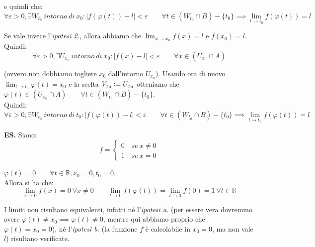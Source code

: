 \documentclass{article}
\begin{document}
\noindent e quindi che:
\begin{equation*}
    \forall \varepsilon > 0, \exists W_{t_0} \ intorno \ di \ x_0 : |f(\varphi(t)) - l| < \varepsilon \qquad \forall t \in (W_{t_0} \cap B) - \{t_0\} \implies \lim_{t \to t_0} f(\varphi(t)) = l
\end{equation*}

\noindent Se vale invece l'\textit{ipotesi 2.}, allora abbiamo che $\lim_{x \to x_0} f(x) = l$ e $f(x_0) = l$. Quindi:
\begin{equation*}
    \forall \varepsilon > 0, \exists U_{x_0} \ intorno \ di \ x_0 : |f(x) - l| < \varepsilon \qquad \forall x \in (U_{x_0} \cap A)
\end{equation*}

\noindent (ovvero non dobbiamo togliere $x_0$ dall'intorno $U_{x_0}$). Usando ora di nuovo $\lim_{t \to t_0} \varphi(t) = x_0$ e la scelta $V_{x_0} \vcentcolon = U_{x_0}$ otteniamo che $\varphi(t) \in (U_{x_0} \cap A) \qquad \forall t \in (W_{t_0} \cap B) - \{t_0\}$.\\
Quindi:
\begin{equation*}
    \forall \varepsilon > 0, \exists W_{t_0} \ intorno \ di \ t_0 : |f(\varphi(t)) - l| < \varepsilon \qquad \forall t \in (W_{t_0} \cap B) - \{t_0\} \implies \lim_{t \to t_0} f(\varphi(t)) = l
\end{equation*}


\noindent\textbf{ES.} Siano:
\begin{equation*}
    f =
    \begin{cases}
       0 \quad se \ x \neq 0\\
       1 \quad se \ x = 0
    \end{cases}
\end{equation*}

\noindent $\varphi(t) = 0 \qquad \forall t \in \mathbb{R}, x_0 = 0, t_0 = 0$.\\
Allora si ha che:
\begin{equation*}
    \lim_{x \to 0} f(x) = 0 \ \forall x \neq 0 \qquad \lim_{t \to 0} f(\varphi(t)) = \lim_{t \to 0} f(0) = 1 \ \forall t \in \mathbb{R}
\end{equation*}

\noindent I limiti non risultano equivalenti, infatti né l'\textit{ipotesi a.} (per essere vera dovremmo avere $\varphi(t) \neq x_0 \implies \varphi(t) \neq 0$, mentre qui abbiamo proprio che $\varphi(t) = x_0 = 0$), né l'\textit{ipotesi b.} (la funzione $f$ è calcolabile in $x_0 = 0$, ma non vale $l$) risultano verificate.\\
\end{document}
